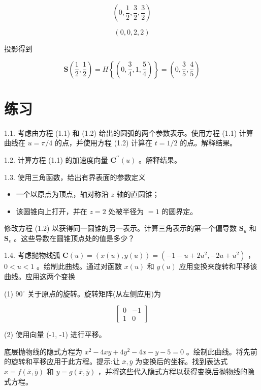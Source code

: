 \documentclass[../main.tex]{subfiles}
\begin{document}
\[
\left( {0,\frac{1}{2},\frac{3}{2},\frac{3}{2}}\right)
\]

\[
\left( {0,0,2,2}\right)
\]

投影得到

\[
\mathbf{S}\left( {\frac{1}{2},\frac{1}{2}}\right)  = H\left\{  \left( {0,\frac{3}{4},1,\frac{5}{4}}\right) \right\}   = \left( {0,\frac{3}{5},\frac{4}{5}}\right)
\]



\section*{练习}

1.1. 考虑由方程 (1.1) 和 (1.2) 给出的圆弧的两个参数表示。使用方程 (1.1) 计算曲线在 \(u = \pi /4\) 的点，并使用方程 (1.2) 计算在 \(t = 1/2\) 的点。解释结果。

1.2. 计算方程 (1.1) 的加速度向量 \({\mathbf{C}}^{\prime \prime }\left( u\right)\) 。解释结果。

1.3. 使用三角函数，给出有界表面的参数定义

\begin{itemize}
\item 一个以原点为顶点，轴对称沿 \(z\) 轴的直圆锥；
\end{itemize}

\begin{itemize}
\item 该圆锥向上打开，并在 \(z = 2\) 处被半径为 \(= 1\) 的圆界定。
\end{itemize}

修改方程 (1.2) 以获得同一圆锥的另一表示。计算三角表示的第一个偏导数 \({\mathbf{S}}_{u}\) 和 \({\mathbf{S}}_{v}\) 。这些导数在圆锥顶点处的值是多少？

1.4. 考虑抛物线弧 \(\mathbf{C}\left( u\right)  = \left( {x\left( u\right) ,y\left( u\right) }\right)  = \left( {-1 - u + 2{u}^{2}, - {2u} + {u}^{2}}\right)\) ， \(0 < u < 1\) 。绘制此曲线。通过对函数 \(x\left( u\right)\) 和 \(y\left( u\right)\) 应用变换来旋转和平移该曲线。应用这两个变换

(1) \({90}^{ \circ  }\) 关于原点的旋转。旋转矩阵(从左侧应用)为

\[
\left\lbrack  \begin{array}{rr} 0 &  - 1 \\  1 & 0 \end{array}\right\rbrack
\]

(2) 使用向量 (-1, -1) 进行平移。

底层抛物线的隐式方程为 \({x}^{2} - {4xy} + 4{y}^{2} - {4x} - y - 5 = 0\) 。绘制此曲线。将先前的旋转和平移应用于此方程。提示:让 \(\bar{x},\bar{y}\) 为变换后的坐标。找到表达式 \(x = f\left( {\bar{x},\bar{y}}\right)\) 和 \(y = g\left( {\bar{x},\bar{y}}\right)\) ，并将这些代入隐式方程以获得变换后抛物线的隐式方程。
\end{document}
